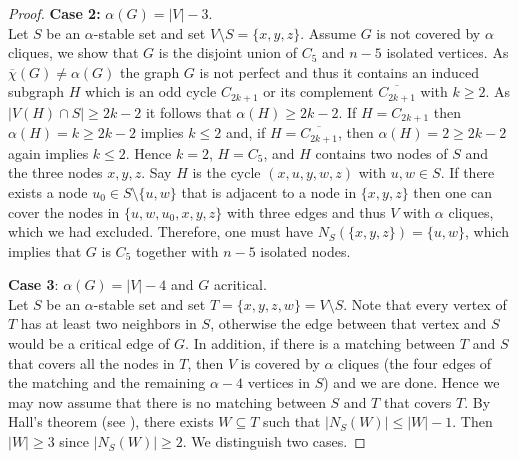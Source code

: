\documentclass[11pt]{article}
\numberwithin{equation}{section}
\begin{document}
\begin{proof}
\smallskip\noindent
\textbf{Case 2:} $\alpha(G)=|V|-3$.
\\
Let $S$ be an $\alpha$-stable set and set $V\setminus{S}=\{x,y,z\}$. Assume $G$ is not covered by $\alpha$ cliques, we show that $G$ is the disjoint union of $C_5$ and $n-5$ isolated vertices. As $\overline \chi(G)\ne \alpha(G)$ the graph $G$  is not perfect and thus it contains an induced subgraph $H$ which is an odd cycle $C_{2k+1}$ or its complement $\overline {C_{2k+1}}$ with $k\ge 2$. As $|V(H)\cap S|\ge 2k-2$ it follows that $\alpha(H)\ge 2k-2$. 
 If $H=C_{2k+1}$ then $\alpha(H)=k\ge 2k-2$ implies $k\le 2$ and, if $H=\overline {C_{2k+1}}$, then $\alpha(H)=2\ge 2k-2$ again implies $k\le 2$. Hence $k=2$, $H=C_5$, and $H$ contains two nodes of $S$ and the three nodes $x,y,z$. Say $H$ is the cycle $(x,u,y,w,z)$ with $u,w\in S$. If there exists a node $u_0\in S\setminus \{u,w\}$ that is adjacent to a node in $\{x,y,z\}$ then one can cover the nodes in $\{u,w,u_0,x,y,z\}$ with three edges and thus $V$ with $\alpha$ cliques, which we had excluded. Therefore, one must have $N_S(\{x,y,z\})=\{u,w\}$, which implies that  $G$ is $C_5$ together with $n-5$ isolated nodes. 
 
\smallskip\noindent
  {\bf Case 3}: $\alpha(G)=|V|-4$ and $G$ acritical.
 \\ Let $S$ be an $\alpha$-stable set and set $T=\{x,y,z,w\}=V\setminus S$. Note that every vertex of $T$ has at least two neighbors in $S$, otherwise the edge between that vertex and $S$ would be a critical edge of $G$. In addition, if there is a matching between $T$ and $S$ that covers all the nodes in $T$, then $V$ is covered by $\alpha$ cliques (the four edges of the matching and the remaining $\alpha-4$ vertices in $S$) and we are done. Hence we may now assume that there is no matching between $S$ and $T$ that covers $T$. By Hall's theorem (see \cite{Hall}), there exists $W\subseteq T$ such that $|N_S(W)|\leq |W|-1$. Then $|W|\ge 3$ since $|N_S(W)|\ge 2$. We distinguish two cases.
  

\end{proof}
\end{document}
